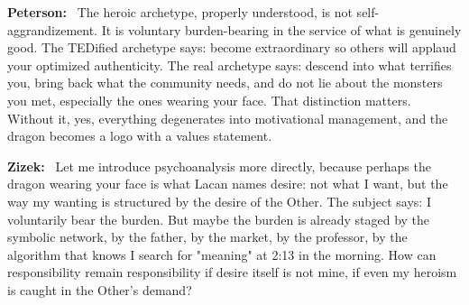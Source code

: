 \documentclass[a4paper,11pt]{article}
\newenvironment{question}{\par\noindent\color{ALIUSRed}\textbf{Zizek:}\ }{\par}
\newenvironment{answer}{\par\noindent\color{black}\textbf{Peterson:}\ }{\par}
\begin{document}
\begin{answer}
The heroic archetype, properly understood, is not self-aggrandizement. It is voluntary burden-bearing in the service of what is genuinely good. The TEDified archetype says: become extraordinary so others will applaud your optimized authenticity. The real archetype says: descend into what terrifies you, bring back what the community needs, and do not lie about the monsters you met, especially the ones wearing your face. That distinction matters. Without it, yes, everything degenerates into motivational management, and the dragon becomes a logo with a values statement.
\end{answer}

\begin{question}
Let me introduce psychoanalysis more directly, because perhaps the dragon wearing your face is what Lacan names desire: not what I want, but the way my wanting is structured by the desire of the Other. The subject says: I voluntarily bear the burden. But maybe the burden is already staged by the symbolic network, by the father, by the market, by the professor, by the algorithm that knows I search for "meaning" at 2:13 in the morning. How can responsibility remain responsibility if desire itself is not mine, if even my heroism is caught in the Other's demand?
\end{question}
\end{document}
